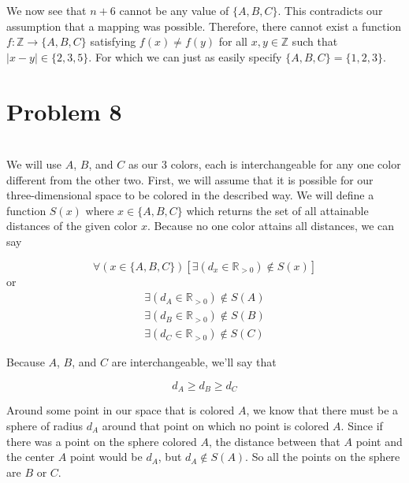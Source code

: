 \documentclass[12pt]{article}
\begin{document}
We now see that $n+6$ cannot be any value of $\{A,B,C\}$. This contradicts our assumption that a mapping was possible. Therefore, there cannot exist a function $f : \mathbb{Z} \rightarrow \{A,B,C\}$ satisfying $f(x) \ne f(y)$ for all $x,y \in \mathbb{Z}$ such that $\left|x - y\right| \in \{2,3,5\}$. For which we can just as easily specify $\{A,B,C\} = \{1,2,3\}$.


\newpage
\section*{Problem 8}
\\

We will use $A$, $B$, and $C$ as our 3 colors, each is interchangeable for any one color different from the other two. First, we will assume that it is possible for our three-dimensional space to be colored in the described way. We will define a function $S(x)$ where $x \in \{A, B, C\}$ which returns the set of all attainable distances of the given color $x$. Because no one color attains all distances, we can say

\[\forall(x \in \{A, B, C\})[\exists (d_x \in \mathbb{R}_{>0}) \notin S(x)]\]
or
\begin{align*}
    \exists (d_A \in \mathbb{R}_{>0}) \notin S(A) \\
    \exists (d_B \in \mathbb{R}_{>0}) \notin S(B) \\
    \exists (d_C \in \mathbb{R}_{>0}) \notin S(C)
\end{align*}

Because $A$, $B$, and $C$ are interchangeable, we'll say that

\[d_A \geq d_B \geq d_C\]

Around some point in our space that is colored $A$, we know that there must be a sphere of radius $d_A$ around that point on which no point is colored $A$. Since if there was a point on the sphere colored $A$, the distance between that $A$ point and the center $A$ point would be $d_A$, but $d_A \notin S(A)$. So all the points on the sphere are $B$ or $C$.

\begin{center}
\end{center}
\end{document}
